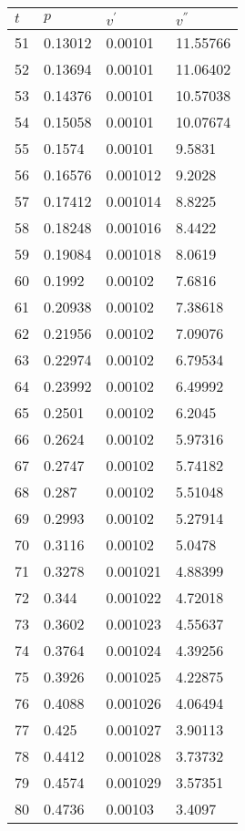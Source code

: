 \documentclass[twocolumn]{article}
\begin{document}
\begin{tabular}{l|l|l|l}
$	t$ &$ p$ &$ v^{'}$ & $v^{''}$ \\ \hline
51	&	0.13012	&	0.00101	&	11.55766 \\ \hline
52	&	0.13694	&	0.00101	&	11.06402 \\ \hline
53	&	0.14376	&	0.00101	&	10.57038 \\ \hline
54	&	0.15058	&	0.00101	&	10.07674 \\ \hline
55	&	0.1574	&	0.00101	&	9.5831 \\ \hline
56	&	0.16576	&	0.001012	&	9.2028 \\ \hline
57	&	0.17412	&	0.001014	&	8.8225 \\ \hline
58	&	0.18248	&	0.001016	&	8.4422 \\ \hline
59	&	0.19084	&	0.001018	&	8.0619 \\ \hline
60	&	0.1992	&	0.00102	&	7.6816 \\ \hline
61	&	0.20938	&	0.00102	&	7.38618 \\ \hline
62	&	0.21956	&	0.00102	&	7.09076 \\ \hline
63	&	0.22974	&	0.00102	&	6.79534 \\ \hline
64	&	0.23992	&	0.00102	&	6.49992 \\ \hline
65	&	0.2501	&	0.00102	&	6.2045 \\ \hline
66	&	0.2624	&	0.00102	&	5.97316 \\ \hline
67	&	0.2747	&	0.00102	&	5.74182 \\ \hline
68	&	0.287	&	0.00102	&	5.51048 \\ \hline
69	&	0.2993	&	0.00102	&	5.27914 \\ \hline
70	&	0.3116	&	0.00102	&	5.0478 \\ \hline
71	&	0.3278	&	0.001021	&	4.88399 \\ \hline
72	&	0.344	&	0.001022	&	4.72018 \\ \hline
73	&	0.3602	&	0.001023	&	4.55637 \\ \hline
74	&	0.3764	&	0.001024	&	4.39256 \\ \hline
75	&	0.3926	&	0.001025	&	4.22875 \\ \hline
76	&	0.4088	&	0.001026	&	4.06494 \\ \hline
77	&	0.425	&	0.001027	&	3.90113 \\ \hline
78	&	0.4412	&	0.001028	&	3.73732 \\ \hline
79	&	0.4574	&	0.001029	&	3.57351 \\ \hline
80	&	0.4736	&	0.00103	&	3.4097 \\ \hline

\end{tabular}
\end{document}
